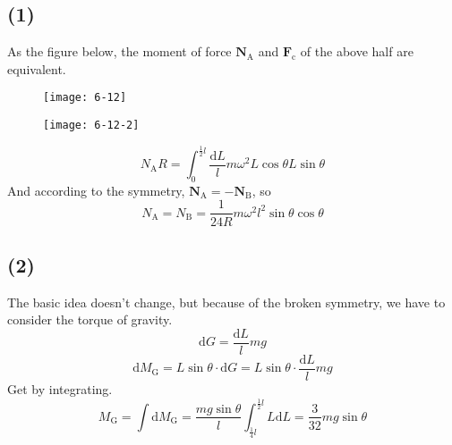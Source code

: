 \documentclass[12pt,a4paper]{article}%
\begin{document}
	\subsection*{(1)}
	\noindent As the figure below, the moment of force $\boldsymbol{N}_\mathrm{A}$ and $\boldsymbol{F}_\mathrm{c}$ of the above half are equivalent.
	\begin{figure}[H]
		\begin{minipage}{0.45\textwidth}
			\centering
			\texttt{[image: 6-12]}
			\caption*{}
		\end{minipage}
		\hfill
		\begin{minipage}{0.45\textwidth}
			\centering
			\texttt{[image: 6-12-2]}
			\caption*{}
		\end{minipage}
	\end{figure}
	\begin{equation}
		N_\mathrm{A}R=\int_0^{\frac{1}{2}l}{\frac{\mathrm{d}L}{l}m}\omega ^2L\cos \theta L\sin \theta 
	\end{equation}
	And according to the symmetry, $\boldsymbol{N}_\mathrm{A}=-\boldsymbol{N}_\mathrm{B}$, so
	\begin{equation*}
		N_\mathrm{A}=N_\mathrm{B}=\frac{1}{24R}m\omega ^2l^2\sin \theta \cos \theta 
	\end{equation*}
	\subsection*{(2)}
	\noindent The basic idea doesn't change, but because of the broken symmetry, we have to consider the torque of gravity.
	\begin{equation}
		\mathrm{d}G=\frac{\mathrm{d}L}{l}mg
	\end{equation}
	\begin{equation}
		\mathrm{d}M_{\mathrm{G}}=L\sin \theta \cdot \mathrm{d}G=L\sin \theta \cdot \frac{\mathrm{d}L}{l}mg
	\end{equation}
	Get by integrating.
	\begin{equation}
		M_{\mathrm{G}}=\int \mathrm{d}M_\mathrm{G}=\frac{mg\sin \theta}{l}\int_{\frac{1}{4}l}^{\frac{1}{2}l}{L\mathrm{d}L}
		=\frac{3}{32}mg\sin \theta
	\end{equation}
	
\end{document}
